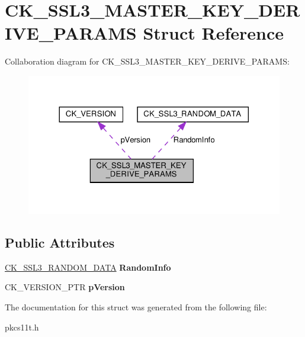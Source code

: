 \hypertarget{struct_c_k___s_s_l3___m_a_s_t_e_r___k_e_y___d_e_r_i_v_e___p_a_r_a_m_s}{}\section{C\+K\+\_\+\+S\+S\+L3\+\_\+\+M\+A\+S\+T\+E\+R\+\_\+\+K\+E\+Y\+\_\+\+D\+E\+R\+I\+V\+E\+\_\+\+P\+A\+R\+A\+MS Struct Reference}
\label{struct_c_k___s_s_l3___m_a_s_t_e_r___k_e_y___d_e_r_i_v_e___p_a_r_a_m_s}


Collaboration diagram for C\+K\+\_\+\+S\+S\+L3\+\_\+\+M\+A\+S\+T\+E\+R\+\_\+\+K\+E\+Y\+\_\+\+D\+E\+R\+I\+V\+E\+\_\+\+P\+A\+R\+A\+MS\+:
\nopagebreak
\begin{figure}[H]
\begin{center}
\leavevmode
\includegraphics[width=324pt]{struct_c_k___s_s_l3___m_a_s_t_e_r___k_e_y___d_e_r_i_v_e___p_a_r_a_m_s__coll__graph}
\end{center}
\end{figure}
\subsection*{Public Attributes}
\begin{DoxyCompactItemize}
\item 
\mbox{\label{struct_c_k___s_s_l3___m_a_s_t_e_r___k_e_y___d_e_r_i_v_e___p_a_r_a_m_s_aed0581ee201c1a5fe44708c819ad7fd1}} 
\hyperlink{struct_c_k___s_s_l3___r_a_n_d_o_m___d_a_t_a}{C\+K\+\_\+\+S\+S\+L3\+\_\+\+R\+A\+N\+D\+O\+M\+\_\+\+D\+A\+TA} {\bfseries Random\+Info}
\item 
\mbox{\label{struct_c_k___s_s_l3___m_a_s_t_e_r___k_e_y___d_e_r_i_v_e___p_a_r_a_m_s_ab0da9dc184f64ed87ed2f70f742bb9a5}} 
C\+K\+\_\+\+V\+E\+R\+S\+I\+O\+N\+\_\+\+P\+TR {\bfseries p\+Version}
\end{DoxyCompactItemize}


The documentation for this struct was generated from the following file\+:\begin{DoxyCompactItemize}
\item 
pkcs11t.\+h\end{DoxyCompactItemize}
